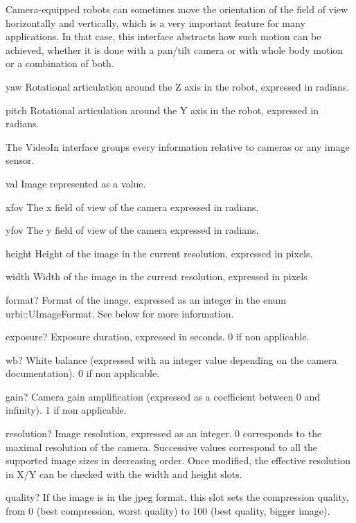 
Camera-equipped robots can sometimes move the orientation of the field of
view horizontally and vertically, which is a very important feature for many
applications. In that case, this interface abstracts how such motion can be
achieved, whether it is done with a pan/tilt camera or with whole body
motion or a combination of both.

\begin{urbiscriptapi}
\item[yaw] Rotational articulation around the Z axis in the robot, expressed
  in radians.
\item[pitch] Rotational articulation around the Y axis in the robot,
  expressed in radians.
\end{urbiscriptapi}


The VideoIn interface groups every information relative to cameras or any
image sensor.

\begin{urbiscriptapi}
\item[val] Image represented as a  value.
\item[xfov] The x field of view of the camera expressed in radians.
\item[yfov] The y field of view of the camera expressed in radians.

\item[height] Height of the image in the current resolution, expressed in
  pixels.

\item[width] Width of the image in the current resolution, expressed in
  pixels

\item[format?]  Format of the image, expressed as an integer in the enum
  urbi::UImageFormat.  See below for more information.

\item[exposure?] Exposure duration, expressed in seconds. 0 if non
  applicable.

\item[wb?]  White balance (expressed with an integer value depending on the
  camera documentation). 0 if non applicable.

\item[gain?]  Camera gain amplification (expressed as a coefficient between
  0 and infinity). 1 if non applicable.

\item[resolution?]  Image resolution, expressed as an integer. 0 corresponds
  to the maximal resolution of the camera. Successive values correspond to
  all the supported image sizes in decreasing order.  Once modified, the
  effective resolution in X/Y can be checked with the width and height
  slots.

\item[quality?]  If the image is in the jpeg format, this slot sets the
  compression quality, from 0 (best compression, worst quality) to 100 (best
  quality, bigger image).
\end{urbiscriptapi}

